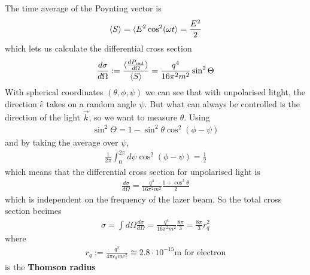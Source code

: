 The time average of the Poynting vector is
\begin{align*}
  \langle S\rangle = \langle E^{2} \cos^{2}(\omega t\rangle = \frac{E^{2}}{2}
\end{align*}
which lets us calculate the differential cross section
\begin{align*}
  \frac{d \sigma}{d \Omega} := \frac{\langle\frac{d P_{\text{rad}}}{d \Omega}\rangle}{\langle S\rangle} = \frac{q^{4}}{16 \pi^{2} m^{2}} \sin^{2} \Theta
\end{align*}
With spherical coordinates $(\theta,\phi,\psi)$ we can see that with unpolarised litght, the direction $\hat{e}$ takes on a random angle $\psi$.
But what can always be controlled is the direction of the light $\vec{k}$, so we want to measure $\theta$.
Using
\begin{align*}
  \sin^{2} \Theta = 1 - \sin^{2} \theta \cos^{2}(\phi - \psi)
\end{align*}
and by taking the average over $\psi$,
\begin{align*}
  \frac{1}{2 \pi}\int_0^{2 \pi} d \psi \cos^{2}(\phi - \psi) = \frac{1}{2} 
\end{align*}
which means that the differential cross section for unpolarised light is
\begin{align*}
  \frac{d \sigma}{d \Omega} = \frac{q^{4}}{16 \pi^{2} m^{2}} \frac{1 + \cos^{2} \theta}{2}
\end{align*}
which is independent on the frequency of the lazer beam.
So the total cross section becimes
\begin{align*}
  \sigma = \int d \Omega \frac{d \sigma}{d \Omega} = \frac{q^{4}}{16 \pi^{2}m^{2}} \frac{8 \pi}{3} = \frac{8 \pi}{3} r_q^{2}
\end{align*}
where
\begin{align*}
  r_q := \frac{q^{2}}{4 \pi \epsilon_0 m c^{2}} \cong 2.8 \cdot 10^{-15}\mathrm{m} \text{ for electron}
\end{align*}
is the \textbf{Thomson radius}





